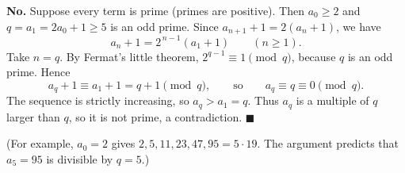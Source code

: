 \textbf{No.} Suppose every term is prime (primes are positive). Then $a_0\ge2$ and $q=a_1=2a_0+1\ge5$ is an odd prime. Since $a_{n+1}+1=2\left(a_n+1\right)$, we have
\[a_n+1=2^{\,n-1}\left(a_1+1\right)\qquad(n\ge1).\]
Take $n=q$. By Fermat's little theorem, $2^{q-1}\equiv1\pmod q$, because $q$ is an odd prime. Hence
\[a_q+1\equiv a_1+1=q+1\pmod q,\qquad\text{so}\qquad a_q\equiv q\equiv0\pmod q.\]
The sequence is strictly increasing, so $a_q>a_1=q$. Thus $a_q$ is a multiple of $q$ larger than $q$, so it is not prime, a contradiction. $\blacksquare$

(For example, $a_0=2$ gives $2,5,11,23,47,95=5\cdot19$. The argument predicts that $a_5=95$ is divisible by $q=5$.)

